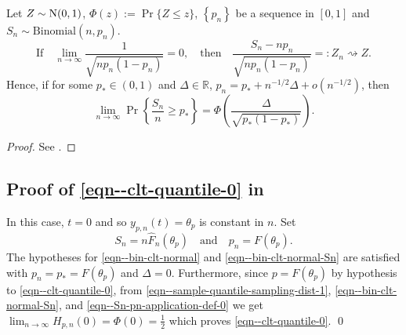 \begin{theorem}
\label{thm--bin-clt-normal}
Let \(Z \sim \mathrm{N} (0, 1)\), \(\Phi (z) := \Pr \{Z \leq z\}\), \(\left\{ p_{n}
\right\}\) be a sequence in \([0, 1]\)
and \(S_{n} \sim \mathrm{Binomial} \left( n, p_{n} \right)\).
\begin{equation}
  \text{If} \quad
  \lim_{n \to \infty} \frac{1}{\sqrt{n p_{n} \left( 1 - p_{n} \right)}} = 0,
  \quad \text{then} \quad \frac{S_{n} - n p_{n}}{\sqrt{n p_{n} \left( 1 - p_{n}
  \right)}} =: Z_{n} \rightsquigarrow Z.
  \label{eqn--bin-clt-normal}
\end{equation}
Hence, if for some \(p_{\ast} \in (0, 1)\) and \(\Delta \in \mathbb{R}\),
\(p_{n} = p_{\ast} + n^{- 1 / 2} \Delta + o \left( n^{- 1 / 2} \right)\),
then
\begin{equation}
  \lim_{n \to \infty} \Pr \left\{ \frac{S_{n}}{n} \geq p_{\ast} \right\} = \Phi
  \left( \frac{\Delta}{\sqrt{p_{\ast} \left( 1 - p_{\ast} \right)}} \right).
  \label{eqn--bin-clt-normal-Sn}
\end{equation}
\end{theorem}

\begin{proof}
See .
\end{proof}

\subsection{Proof of
\texorpdfstring{\eqref{eqn--clt-quantile-0}}{(\ref{eqn--clt-quantile-0})}
in \texorpdfstring{}{Theorem \ref{thm--clt-quantile}}}

In this case, \(t = 0\) and so \(y_{p, n} (t) = \theta_{p}\) is constant in
\(n\).
Set
\begin{equation}
  S_{n} = n \widehat{F}_{n} \left( \theta_{p} \right) \quad \text{and} \quad
  p_{n} = F \left( \theta_{p} \right).
  \label{eqn--Sn-pn-application-def-0}
\end{equation}
The hypotheses for \eqref{eqn--bin-clt-normal} and
\eqref{eqn--bin-clt-normal-Sn} are satisfied with \(p_{n} = p_{\ast} = F \left(
\theta_{p} \right)\) and \(\Delta = 0\).
Furthermore, since \(p = F \left( \theta_{p} \right)\) by hypothesis to
\eqref{eqn--clt-quantile-0}, from \eqref{eqn--sample-quantile-sampling-dist-1},
\eqref{eqn--bin-clt-normal-Sn}, and \eqref{eqn--Sn-pn-application-def-0} we get
\(\lim_{n \to \infty} H_{p, n} (0) = \Phi (0) = \frac{1}{2}\) which proves
\eqref{eqn--clt-quantile-0}.
\qed

